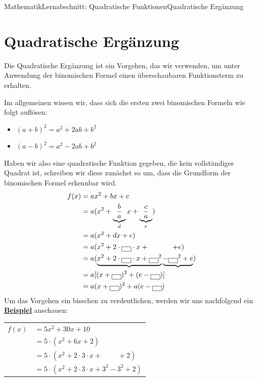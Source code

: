 \documentclass[11pt,twocolumn,oneside,openany,headings=optiontotoc,11pt,numbers=noenddot]{article}
\begin{document}
	\begin{worksheet}{Mathematik}{Lernabschnitt: Quadratische Funktionen}{Quadratische Ergänzung}
		\setcounter{section}{2}
		\section{Quadratische Ergänzung}
		Die Quadratische Ergänzung ist ein Vorgehen, das wir verwenden, um unter Anwendung der binomischen Formel einen überschaubaren Funktionsterm zu erhalten.\\
		\par\noindent
		Im allgemeinen wissen wir, dass sich die ersten zwei binomischen Formeln wie folgt auflösen:
		\begin{itemize}
			\item[] \((a+b)^2 = a^2 + 2ab + b^2\)
			\item[] \((a-b)^2 = a^2 - 2ab + b^2\)
		\end{itemize}
		Haben wir also eine quadratische Funktion gegeben, die kein vollständiges Quadrat ist, schreiben wir diese zunächst so um, dass die Grundform der binomischen Formel erkennbar wird.\\
		\begin{align*}
			f(x) & = ax^2 + bx +c\\
			& = a(x^2+\underbrace{\frac{b}{a}}_{d}x + \underbrace{\frac{c}{a}}_{e})\\
			& = a(x^2 + dx + e)\\
			& = a(x^2 + 2\cdot\fbox{\ \ }\cdot{}x +\ \ \ \ \ \ \ \ \ \ + e)\\
			& = a(\underbrace{x^2 + 2\cdot\fbox{\ \ }\cdot{}x + \fbox{\ \ }^2} \underbrace{- \fbox{\ \ }^2 + e})\\
			& = a[(x+\fbox{\ \ })^2 + (e-\fbox{\ \ })]\\
			& = a(x+\fbox{\ \ })^2 + a(e-\fbox{\ \ })
		\end{align*}
		Um das Vorgehen ein bisschen zu verdeutlichen, werden wir uns nachfolgend ein \underline{\textbf{Beispiel}} anschauen:\\
		\par\noindent
		\begin{tabularx}{0.48\textwidth}{lX}
			\(f(x)\) & \( = 5x^2 + 30x +10\)\\
			& \(= 5\cdot(x^2 + 6x + 2)\)\\
			& \(= 5\cdot(x^2 + 2\cdot{}3\cdot{}x +\ \ \ \ \ \ \ \ \ \ + 2)\)\\
			& \(= 5\cdot(x^2 + 2\cdot{}3\cdot{}x + 3^2 - 3^2 + 2)\)\\

\end{tabularx}
\end{worksheet}
\end{document}
